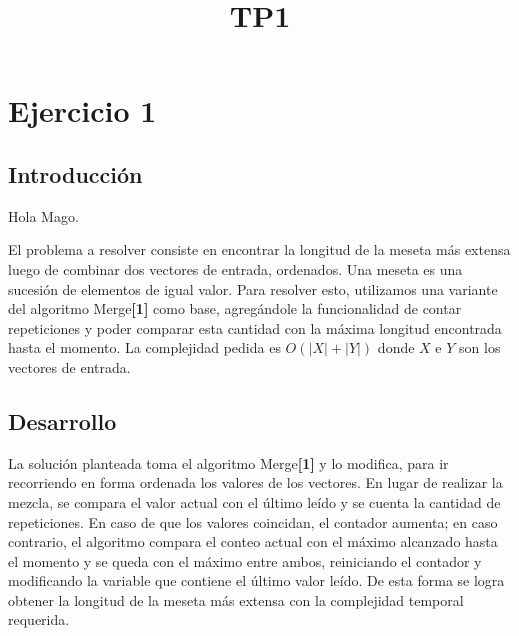 \documentclass[10pt, a4paper,english,spanish]{article}
\title{TP1}
\begin{document}
\fecha{\today}
\maketitle
\newpage

\thispagestyle{empty}

\tableofcontents

\newpage

\section{Ejercicio 1}

\subsection{Introducción}

Hola Mago.

El problema a resolver consiste en encontrar la longitud de la meseta más extensa luego de combinar dos vectores de entrada, ordenados.
Una meseta es una sucesión de elementos de igual valor.  
Para resolver esto, utilizamos una variante del algoritmo Merge\textbf{[1]} como base, agregándole la funcionalidad de contar repeticiones y
poder comparar esta cantidad con la máxima longitud encontrada hasta el momento. La complejidad pedida es $O(|X| + |Y|)$ donde
$X$ e $Y$ son los vectores de entrada.

\subsection{Desarrollo}
La solución planteada toma el algoritmo Merge\textbf{[1]} y lo modifica, para ir recorriendo en forma ordenada los valores de los 
vectores. En lugar de realizar la mezcla, se compara el valor actual con el último leído y se cuenta la cantidad de repeticiones.
En caso de que los valores coincidan, el contador aumenta; en caso contrario, el algoritmo compara el conteo actual con el máximo
alcanzado hasta el momento y se queda con el máximo entre ambos, reiniciando el contador y modificando la variable
que contiene el último valor leído. De esta forma se logra obtener la longitud de la meseta más extensa con la complejidad temporal requerida.
\end{document}
